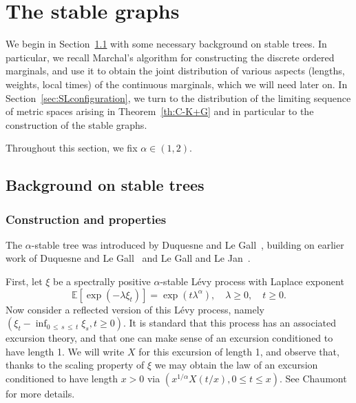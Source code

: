\documentclass[10pt]{amsart}
\theoremstyle{definition}\newtheorem{defi}[theo]{Definition}\newtheorem{rema}[theo]{Remark}\newtheorem{exam}[theo]{Example}\newtheorem{exem}[theo]{Example}\newtheorem{nota}[theo]{Notation}
\newcommand{\E}[1]{\ensuremath{\mathbb{E} \left[#1 \right]}}
\begin{document}
\section{The stable graphs}\label{sec:SL}

We begin in Section~\ref{sec:stable} with some necessary background on stable trees. In particular, we recall Marchal's algorithm for constructing the discrete ordered marginals, and use it to obtain the joint distribution of various aspects (lengths, weights, local times) of the continuous marginals, which we will need later on. In Section~\ref{sec:SLconfiguration}, we turn to the distribution of the limiting sequence of metric spaces arising in Theorem~\ref{th:C-K+G} and in particular to the construction of the stable graphs.

Throughout this section, we fix $\alpha \in (1,2)$.

\subsection{Background on stable trees}\label{sec:stable}

\subsubsection{Construction and properties} \label{subsec:alphastable}

The $\alpha$-stable tree was introduced by Duquesne and Le Gall~\cite{DLG05}, building on earlier work of Duquesne and Le Gall~\cite{DuquesneLeGall} and Le Gall and Le Jan~\cite{LeGallLeJan}.

First, let $\xi$ be a spectrally positive $\alpha$-stable Lévy process with Laplace exponent
\[
\E{\exp\left(-\lambda \xi_t\right)} = \exp\left(t \lambda^{\alpha}\right), \quad \lambda \ge 0, \quad t \ge 0.
\]
Now consider a reflected version of this Lévy process, namely $(\xi_t - \inf_{0\,\le\,s\,\le\,t} \xi_s, t \ge 0)$. It is standard that this process has an associated excursion theory, and that one can make sense of an excursion conditioned to have length 1. We will write $X$ for this excursion of length 1, and observe that, thanks to the scaling property of $\xi$ we may obtain the law of an excursion conditioned to have length $x > 0$ via $(x^{1/\alpha} X(t/x), 0 \le t \le x)$. See Chaumont~\cite{Chaumont} for more details.
\end{document}
